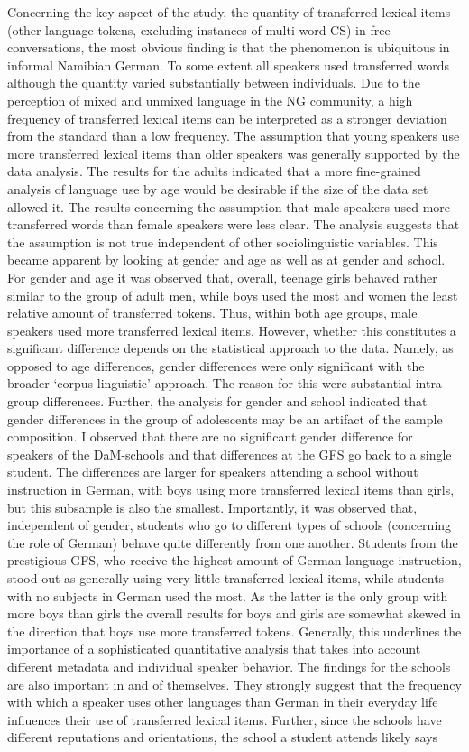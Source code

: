 \documentclass[output=paper]{langsci/langscibook}
\begin{document}
Concerning the key aspect of the study, the quantity of transferred lexical items (other-language tokens, excluding instances of multi-word CS) in free conversations, the most obvious finding is that the phenomenon is ubiquitous in informal Namibian German. To some extent all speakers used transferred words although the quantity varied substantially between individuals. Due to the perception of mixed and unmixed language in the NG community, a high frequency of transferred lexical items can be interpreted as a stronger deviation from the standard than a low frequency. The assumption that young speakers use more transferred lexical items than older speakers was generally supported by the data analysis. The results for the adults indicated that a more fine-grained analysis of language use by age would be desirable if the size of the data set allowed it. The results concerning the assumption that male speakers used more transferred words than female speakers were less clear. The analysis suggests that the assumption is not true independent of other sociolinguistic variables. This became apparent by looking at gender and age as well as at gender and school. For gender and age it was observed that, overall, teenage girls behaved rather similar to the group of adult men, while boys used the most and women the least relative amount of transferred tokens. Thus, within both age groups, male speakers used more transferred lexical items. However, whether this constitutes a significant difference depends on the statistical approach to the data. Namely, as opposed to age differences, gender differences were only significant with the broader ‘corpus linguistic’ approach. The reason for this were substantial intra-group differences. Further, the analysis for gender and school indicated that gender differences in the group of adolescents may be an artifact of the sample composition. I observed that there are no significant gender difference for speakers of the DaM-schools and that differences at the GFS go back to a single student. The differences are larger for speakers attending a school without instruction in German, with boys using more transferred lexical items than girls, but this subsample is also the smallest. Importantly, it was observed that, independent of gender, students who go to different types of schools (concerning the role of German) behave quite differently from one another. Students from the prestigious GFS, who receive the highest amount of German-language instruction, stood out as generally using very little transferred lexical items, while students with no subjects in German used the most. As the latter is the only group with more boys than girls the overall results for boys and girls are somewhat skewed in the direction that boys use more transferred tokens. Generally, this underlines the importance of a sophisticated quantitative analysis that takes into account different metadata and individual speaker behavior. The findings for the schools are also important in and of themselves. They strongly suggest that the frequency with which a speaker uses other languages than German in their everyday life influences their use of transferred lexical items. Further, since the schools have different reputations and orientations, the school a student attends likely says 
\end{document}
